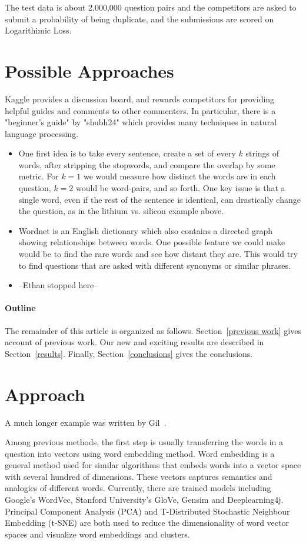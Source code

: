 \documentclass[12pt]{article}
\begin{document}
The test data is about 2,000,000 question pairs and the competitors are asked to submit a probability of being duplicate, and the submissions are scored on Logarithimic Loss.

\section{Possible Approaches}
Kaggle provides a discussion board, and rewards competitors for providing helpful guides and comments to other commenters. In particular, there is a "beginner's guide" by "shubh24" which provides many techniques in natural language processing.
\begin{itemize}
\item One first idea is to take every sentence, create a set of every $k$ strings of words, after stripping the stopwords, and compare the overlap by some metric. For $k=1$ we would measure how distinct the words are in each question, $k=2$ would be word-pairs, and so forth. One key issue is that a single word, even if the rest of the sentence is identical, can drastically change the question, as in the lithium vs. silicon example above.
\item Wordnet is an English dictionary which also contains a directed graph showing relationships between words. One possible feature we could make would be to find the rare words and see how distant they are. This would try to find questions that are asked with different synonyms or similar phrases.
\item --Ethan stopped here--
\end{itemize}

\paragraph{Outline}
The remainder of this article is organized as follows.
Section~\ref{previous work} gives account of previous work.
Our new and exciting results are described in Section~\ref{results}.
Finally, Section~\ref{conclusions} gives the conclusions.

\section{Approach}\label{approach}
A much longer \LaTeXe{} example was written by Gil~\cite{Gil:02}.

Among previous methods, the first step is usually transferring the words in a question into vectors using word embedding method. Word embedding is a general method used for similar algorithms that embeds words into a vector space with several hundred of dimensions. These vectors captures semantics and analogies of different words. Currently, there are trained models including Google’s WordVec, Stanford University’s GloVe, Gensim and Deeplearning4j.  Principal Component Analysis (PCA) and T-Distributed Stochastic Neighbour Embedding (t-SNE) are both used to reduce the dimensionality of word vector spaces and visualize word embeddings and clusters.
\end{document}
